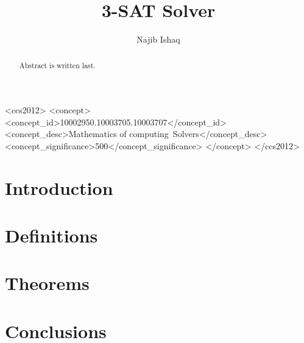 \documentclass[sigchi]{acmart}
\begin{document}
\title{3-SAT Solver}

\author{Najib Ishaq}

\begin{abstract}
    Abstract is written last.
\end{abstract}

\begin{CCSXML}
<ccs2012>
<concept>
<concept_id>10002950.10003705.10003707</concept_id>
<concept_desc>Mathematics of computing~Solvers</concept_desc>
<concept_significance>500</concept_significance>
</concept>
</ccs2012>
\end{CCSXML}



\maketitle

\section{Introduction}
\label{sec:introduction}


\section{Definitions}
\label{sec:definitions}


\section{Theorems}
\label{sec:theorems}


\section{Conclusions}
\label{sec:conclusions}




\end{document}
